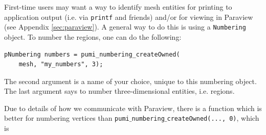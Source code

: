 \documentclass{article}
\begin{document}
First-time users may want a way to identify mesh entities for
printing to application output (i.e. via \texttt{printf} and friends)
and/or for viewing in Paraview (see Appendix \ref{sec:paraview}).
A general way to do this is using a \texttt{Numbering} object.
To number the regions, one can do the following:

\begin{lstlisting}
pNumbering numbers = pumi_numbering_createOwned(
    mesh, "my_numbers", 3);
\end{lstlisting}

The second argument is a name of your choice, unique to this numbering object.
The last argument says to number three-dimensional entities, i.e. regions.

Due to details of how we communicate with Paraview, there is a
function which is better for numbering vertices than
\texttt{pumi$\_$numbering$\_$createOwned(..., 0)}, which is
\end{document}
